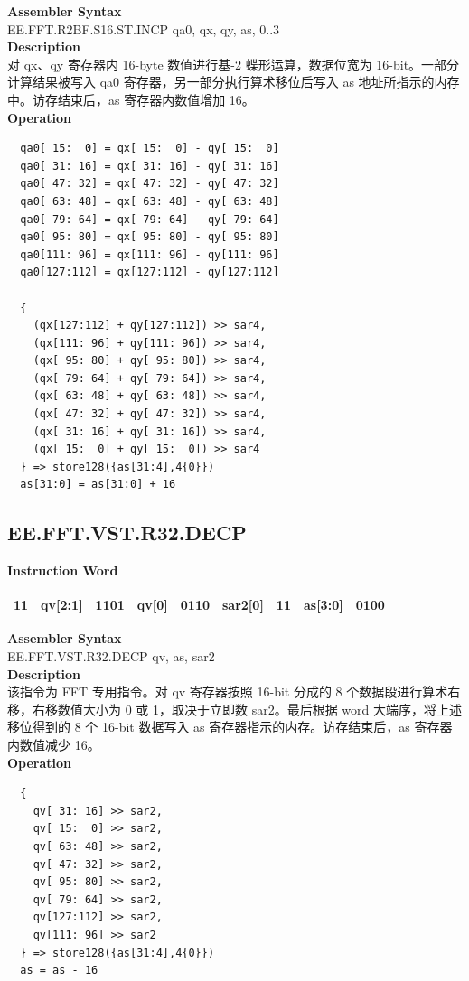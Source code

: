 \textbf{Assembler Syntax} \\
EE.FFT.R2BF.S16.ST.INCP qa0, qx, qy, as, 0..3 \\
\textbf{Description} \\
对 qx、qy 寄存器内 16-byte 数值进行基-2 蝶形运算，数据位宽为 16-bit。一部分计算结果被写入 qa0 寄存器，另一部分执行算术移位后写入 as 地址所指示的内存中。访存结束后，as 寄存器内数值增加 16。\\
\textbf{Operation}
\begin{lstlisting}
  qa0[ 15:  0] = qx[ 15:  0] - qy[ 15:  0]
  qa0[ 31: 16] = qx[ 31: 16] - qy[ 31: 16]
  qa0[ 47: 32] = qx[ 47: 32] - qy[ 47: 32]
  qa0[ 63: 48] = qx[ 63: 48] - qy[ 63: 48]
  qa0[ 79: 64] = qx[ 79: 64] - qy[ 79: 64]
  qa0[ 95: 80] = qx[ 95: 80] - qy[ 95: 80]
  qa0[111: 96] = qx[111: 96] - qy[111: 96]
  qa0[127:112] = qx[127:112] - qy[127:112]

  {
    (qx[127:112] + qy[127:112]) >> sar4,
    (qx[111: 96] + qy[111: 96]) >> sar4,
    (qx[ 95: 80] + qy[ 95: 80]) >> sar4,
    (qx[ 79: 64] + qy[ 79: 64]) >> sar4,
    (qx[ 63: 48] + qy[ 63: 48]) >> sar4,
    (qx[ 47: 32] + qy[ 47: 32]) >> sar4,
    (qx[ 31: 16] + qy[ 31: 16]) >> sar4,
    (qx[ 15:  0] + qy[ 15:  0]) >> sar4
  } => store128({as[31:4],4{0}})
  as[31:0] = as[31:0] + 16
\end{lstlisting}

\clearpage
\subsection{EE.FFT.VST.R32.DECP}\label{instruction:EEFFTVSTR32DECP}
\setlength\tabcolsep{6pt}
\textbf{Instruction Word} \\
\begin{tabular}{|c|c|c|c|c|c|c|c|c|}
	\hline
	11 & qv[2:1] & 1101 & qv[0] & 0110 & sar2[0] & 11 & as[3:0] & 0100 \\
	\hline
\end{tabular}

\textbf{Assembler Syntax} \\
EE.FFT.VST.R32.DECP qv, as, sar2 \\
\textbf{Description} \\
该指令为 FFT 专用指令。对 qv 寄存器按照 16-bit 分成的 8 个数据段进行算术右移，右移数值大小为 0 或 1，取决于立即数 sar2。最后根据 word 大端序，将上述移位得到的 8 个 16-bit 数据写入 as 寄存器指示的内存。访存结束后，as 寄存器内数值减少 16。\\
\textbf{Operation}
\begin{lstlisting}
  {
    qv[ 31: 16] >> sar2,
    qv[ 15:  0] >> sar2,
    qv[ 63: 48] >> sar2,
    qv[ 47: 32] >> sar2,
    qv[ 95: 80] >> sar2,
    qv[ 79: 64] >> sar2,
    qv[127:112] >> sar2,
    qv[111: 96] >> sar2
  } => store128({as[31:4],4{0}})
  as = as - 16
\end{lstlisting}

